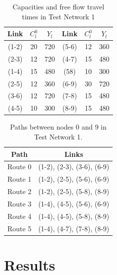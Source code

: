 \documentclass[12pt, a4paper, onecolumn]{article}
\begin{document}
\begin{table}[h!]
	\begin{center}
		\caption{Capacities and free flow travel times in Test Network 1}
		\label{tab:net1}
		\begin{tabular}{ccc|ccc}
			\hline 
			Link & $C_{l}^{0}$ & $Y_{l}$ & Link & $C_{l}^{0}$ & $Y_{l}$ \\
			\hline
			(1-2) & 20 & 720 & (5-6) & 12 & 360 \\
			(2-3) & 12 & 720 & (4-7) & 15 & 480 \\
			(1-4) & 15 & 480 & (58) & 10 & 300 \\
			(2-5) & 12 & 360 & (6-9) & 30 & 720\\
			(3-6) & 12 & 720 & (7-8) & 15 & 480 \\
			(4-5) & 10 & 300 & (8-9) & 15 & 480 \\
			\hline
			\end{tabular}
		\end{center}
	\end{table}

\begin{table}[h!]
	\begin{center}
		\caption{Paths between nodes 0 and 9 in Test Network 1.}
		\label{tab:net1routes}
		\begin{tabular}{c|c}
			\hline
			Path & Links \\
			\hline
			Route 0 & (1-2), (2-3), (3-6), (6-9)\\
			Route 1 & (1-2), (2-5), (5-6), (6-9)\\
			Route 2 & (1-2), (2-5), (5-8), (8-9)\\
			Route 3 & (1-4), (4-5), (5-6), (6-9)\\
			Route 4 & (1-4), (4-5), (5-8), (8-9)\\
			Route 5 & (1-4), (4-7), (7-8), (8-9)\\
			\hline
			\end{tabular}
		\end{center}
	\end{table}


\pagebreak

\section{Results}
\end{document}
